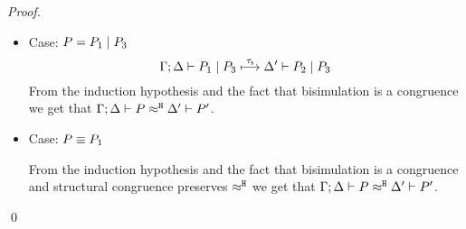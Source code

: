 \begin{proof}
\begin{itemize}
	\item  Case: $P = P_1 \;|\; P_3$
%
	\[
		\Gamma; \Delta \vdash P_1 \;|\; P_3 \stackrel{\tau_{\mathsf{s}}}{\longmapsto} \Delta' \vdash P_2 \;|\; P_3
	\]
%
	\noi From the induction hypothesis and the fact that bisimulation is a congruence
	we get that $\Gamma; \Delta \vdash P \approx^\mathtt{H} \Delta' \vdash P'$.

	\item   Case: $P \equiv P_1$

	From the induction hypothesis and the fact that bisimulation is a congruence
	and structural congruence preserves $\approx^\mathtt{H}$
	we get that $\Gamma; \Delta \vdash P \approx^\mathtt{H} \Delta' \vdash P'$.
	\end{itemize}
	\qed
\end{proof}


